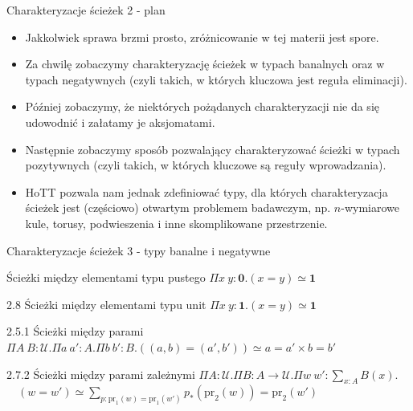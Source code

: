\documentclass{beamer}
\newcommand{\U}{\mathcal{U}}
\newcommand{\prl}{\text{pr}_1}
\newcommand{\prr}{\text{pr}_2}
\begin{document}
\begin{frame}{Charakteryzacje ścieżek 2 - plan}
\begin{itemize}
	\item Jakkolwiek sprawa brzmi prosto, zróżnicowanie w tej materii jest spore.
	\item Za chwilę zobaczymy charakteryzację ścieżek w typach banalnych oraz w typach negatywnych (czyli takich, w których kluczowa jest reguła eliminacji).
	\item Później zobaczymy, że niektórych pożądanych charakteryzacji nie da się udowodnić i załatamy je aksjomatami.
	\item Następnie zobaczymy sposób pozwalający charakteryzować ścieżki w typach pozytywnych (czyli takich, w których kluczowe są reguły wprowadzania).
	\item HoTT pozwala nam jednak zdefiniować typy, dla których charakteryzacja ścieżek jest (częściowo) otwartym problemem badawczym, np. $n$-wymiarowe kule, torusy, podwieszenia i inne skomplikowane przestrzenie.
\end{itemize}
\end{frame}

\begin{frame}{Charakteryzacje ścieżek 3 - typy banalne i negatywne}

\begin{block}{Ścieżki między elementami typu pustego}
$\Pi x\ y : \textbf{0}. (x = y) \simeq \textbf{1}$
\end{block}

\begin{block}{2.8 Ścieżki między elementami typu unit}
$\Pi x\ y : \textbf{1}. (x = y) \simeq \textbf{1}$
\end{block}

\begin{block}{2.5.1 Ścieżki między parami}
$\Pi A\ B : \U. \Pi a\ a' : A. \Pi b\ b': B. ((a, b) = (a', b')) \simeq a = a' \times b = b'$
\end{block}

\begin{block}{2.7.2 Ścieżki między parami zależnymi}
$\Pi A : \U. \Pi B : A \to \U. \Pi w\ w' : \sum_{x : A} B(x).$ \\
$\displaystyle \quad (w = w') \simeq \sum_{p : \prl(w) = \prl(w')} p_*(\prr(w)) = \prr(w')$
\end{block}

\end{frame}
\end{document}
